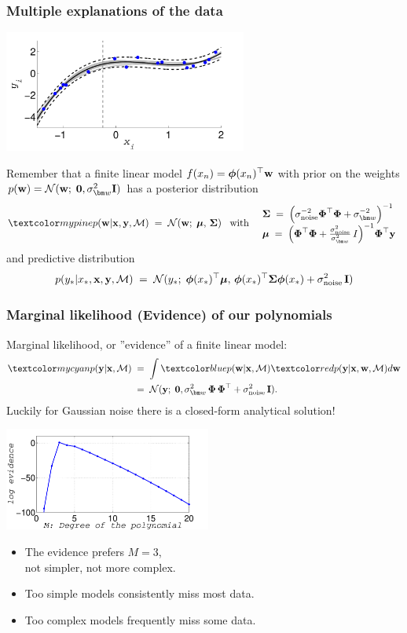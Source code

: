 \begin{frame}
\frametitle{Multiple explanations of the data}

\vskip 1.5mm
\centerline{\includegraphics[width=0.6\textwidth]{polynomial_deg3_predictive_dist_and_post_samples}}

Remember that a finite linear model $f(x_n)=\boldsymbol{\phi}(x_n)^\top\mathbf w$ with prior on the weights 
$p(\bfw)=\N(\bfw;\; \mathbf{0}, \sigma_{\bm w}^2 \bfI)$ has a posterior distribution
\[
\Green{p(\bfw|\bfx,\bfy,\mathcal{M})}\;=\;\N(\bfw;\;\bmu,\,\bSigma)
\mathrm{\; \; \; with \; \; \;}
\begin{array}{l}
\bSigma\;=\;\left(\sigma_\mathrm{noise}^{-2}\bPhi^\top\bPhi+
  \sigma_{\bm w}^{-2}\right)^{-1}\\
\bmu\;=\;\Big(\bPhi^\top\bPhi+
  \frac{\sigma_\mathrm{noise}^2}{\sigma_{\bm w}^2}\,I\Big)^{-1}\bPhi^\top\bfy
\end{array}
\]
and predictive distribution
\[
p(y_*|x_*,\mathbf x, \mathbf y,\mathcal{M})\;=\;
\mathcal{N}(y_*;\; \boldsymbol{\phi}(x_*)^\top{\boldsymbol{\mu}},\,\boldsymbol{\phi}(x_*)^\top\boldsymbol{\Sigma}\boldsymbol{\phi}(x_*)+\sigma_\mathrm{noise}^2\,\mathbf I)
\]
\end{frame}



\begin{frame}
\frametitle{Marginal likelihood (Evidence) of our polynomials}

Marginal likelihood, or ''evidence'' of a finite linear model:
\[
\begin{split}
\Cyan{p(\bfy|\bfx,\mathcal{M})}\;&=\;
\int \Blue{p(\bfw|\bfx,\mathcal{M})}
\Red{p(\bfy|\bfx,\bfw,\mathcal{M})}  d{\bf w}\\
&=\;\N(\bfy;\;\mathbf{0},\sigma_{\bm w}^2\,\bPhi\,\bPhi^\top+\sigma_\mathrm{noise}^2\,\bfI).
\end{split}
\]
Luckily for Gaussian noise there is a closed-form analytical solution!
%
\parbox{0.5\textwidth}{
\centerline{\includegraphics[width=0.51\textwidth]{polynomial_evidence}}
}
\hfill
\parbox{0.49\textwidth}{
\begin{itemize}
\item The evidence prefers $M=3$,\\ not simpler, not more complex.
\item Too simple models consistently miss most data.
\item Too complex models frequently miss some data.
\end{itemize}
}
\end{frame}


